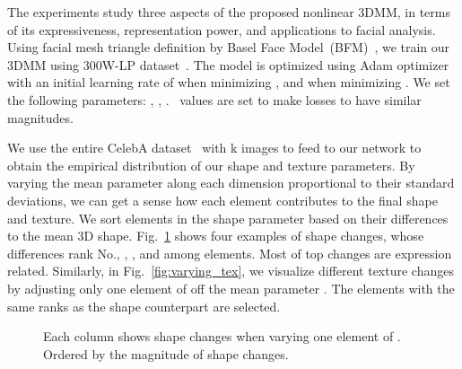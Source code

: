 \label{sec:exp}

The experiments study three aspects of the proposed nonlinear 3DMM, in terms of its expressiveness, representation power, and applications to facial analysis.
Using facial mesh triangle definition by Basel Face Model~(BFM)~\cite{paysan20093d}, we train our 3DMM using 300W-LP dataset~\cite{zhu2016face}. 
The model is optimized using Adam optimizer with an initial learning rate of  when minimizing , and  when minimizing .
We set the following parameters: , , . ~values are set to make losses to have similar magnitudes.


We use the entire CelebA dataset~\cite{liu2015faceattributes} with k images to feed to our network to obtain the empirical distribution of our shape and texture parameters. 
By varying the mean parameter along each dimension proportional to their standard deviations, we can get a sense how each element contributes to the final shape and texture.
We sort elements in the shape parameter  based on their differences to the mean 3D shape. 
Fig.~\ref{fig:varying_shape} shows four examples of shape changes, whose differences rank No., , , and  among  elements.
Most of top changes are expression related.
Similarly, in Fig.~\ref{fig:varying_tex}, we visualize different texture changes by adjusting only one element of  off the mean parameter .
The elements with the same  ranks as the shape counterpart are selected.


\begin{figure}[t!]

\begin{center}
\small
\setlength{\tabcolsep}{3pt}
\vspace{-2mm}
\caption{\small Each column shows shape changes when varying one element of . Ordered by the magnitude of shape changes.}
\label{fig:varying_shape}\figvspace \vspace{-2mm}
\end{center}

\end{figure}


